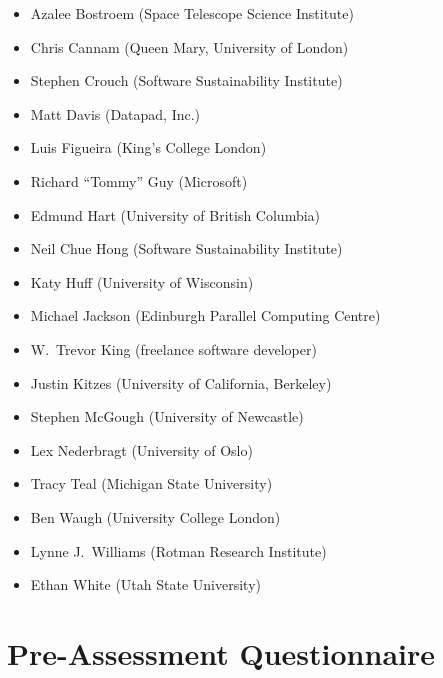 \documentclass[10pt,a4paper,twocolumn]{article}
\begin{document}
\begin{itemize}
\item
  Azalee Bostroem (Space Telescope Science Institute)
\item
  Chris Cannam (Queen Mary, University of London)
\item
  Stephen Crouch (Software Sustainability Institute)
\item
  Matt Davis (Datapad, Inc.)
\item
  Luis Figueira (King's College London)
\item
  Richard ``Tommy'' Guy (Microsoft)
\item
  Edmund Hart (University of British Columbia)
\item
  Neil Chue Hong (Software Sustainability Institute)
\item
  Katy Huff (University of Wisconsin)
\item
  Michael Jackson (Edinburgh Parallel Computing Centre)
\item
  W.\ Trevor King (freelance software developer)
\item
  Justin Kitzes (University of California, Berkeley)
\item
  Stephen McGough (University of Newcastle)
\item
  Lex Nederbragt (University of Oslo)
\item
  Tracy Teal (Michigan State University)
\item
  Ben Waugh (University College London)
\item
  Lynne J.\ Williams (Rotman Research Institute)
\item
  Ethan White (Utah State University)
\end{itemize}

\nocite{*}
{\small
}

\appendix

\section{Pre-Assessment Questionnaire}
\end{document}
